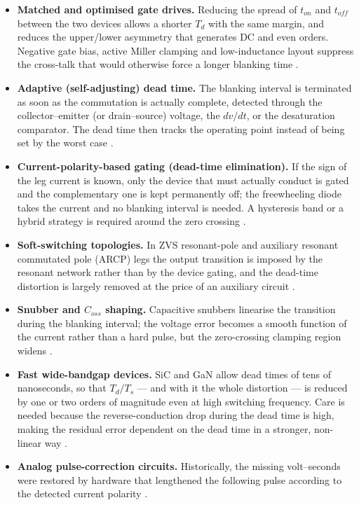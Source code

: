 \documentclass[11pt,a4paper]{article}
\begin{document}
\begin{itemize}
\item \textbf{Matched and optimised gate drives.} Reducing the spread of $t_{on}$ and
$t_{off}$ between the two devices allows a shorter $T_d$ with the same margin, and reduces
the upper/lower asymmetry that generates DC and even orders. Negative gate bias, active
Miller clamping and low-inductance layout suppress the cross-talk that would otherwise
force a longer blanking time \cite{zhang2015,wintrich2015}.
\item \textbf{Adaptive (self-adjusting) dead time.} The blanking interval is terminated as
soon as the commutation is actually complete, detected through the collector--emitter (or
drain--source) voltage, the $dv/dt$, or the desaturation comparator. The dead time then
tracks the operating point instead of being set by the worst case
\cite{chen2008,lin2009,park2012}.
\item \textbf{Current-polarity-based gating (dead-time elimination).} If the sign of the
leg current is known, only the device that must actually conduct is gated and the
complementary one is kept permanently off; the freewheeling diode takes the current and no
blanking interval is needed. A hysteresis band or a hybrid strategy is required around the
zero crossing \cite{chen2008,lin2009,wang2011}.
\item \textbf{Soft-switching topologies.} In ZVS resonant-pole and auxiliary resonant
commutated pole (ARCP) legs the output transition is imposed by the resonant network
rather than by the device gating, and the dead-time distortion is largely removed at the
price of an auxiliary circuit \cite{devoncy1990,mcmurray1989}.
\item \textbf{Snubber and $C_{oss}$ shaping.} Capacitive snubbers linearise the transition
during the blanking interval; the voltage error becomes a smooth function of the current
rather than a hard pulse, but the zero-crossing clamping region widens
\cite{zhang2014}.
\item \textbf{Fast wide-bandgap devices.} SiC and GaN allow dead times of tens of
nanoseconds, so that $T_d/T_s$ --- and with it the whole distortion --- is reduced by one
or two orders of magnitude even at high switching frequency. Care is needed because the
reverse-conduction drop during the dead time is high, making the residual error dependent
on the dead time in a stronger, non-linear way \cite{lidow2019,zhang2015}.
\item \textbf{Analog pulse-correction circuits.} Historically, the missing volt--seconds
were restored by hardware that lengthened the following pulse according to the detected
current polarity \cite{murai1987,dodson1990}.
\end{itemize}
\end{document}

